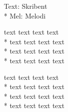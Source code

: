 

\pagestyle{Example Kaptiel}


\begin{SongText}[Låtnamn]
    \begin{SongInfo}
        Text: Skribent\\*%
        Mel: Melodi
    \end{SongInfo}
    \begin{SongVerse}
        text text text text\\*%
        text text text text\\*%
        text text text text\\*%
        text text text text
    \end{SongVerse}
    \begin{SongVerse}
        text text text text\\*%
        text text text text\\*%
        text text text text\\*%
        text text text text 
    \end{SongVerse}
\end{SongText}
\newpage